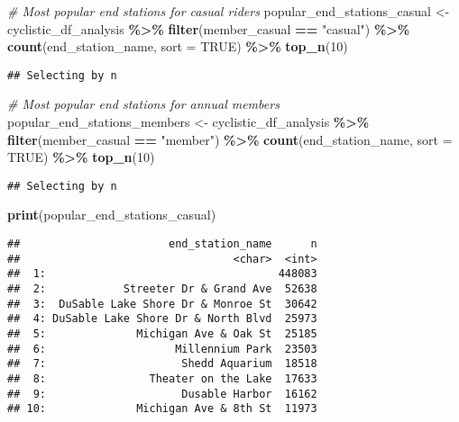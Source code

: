 \documentclass[
]{article}
\newenvironment{Shaded}{\begin{snugshade}}{\end{snugshade}}
\newcommand{\AttributeTok}[1]{\textcolor[rgb]{0.13,0.29,0.53}{#1}}
\newcommand{\CommentTok}[1]{\textcolor[rgb]{0.56,0.35,0.01}{\textit{#1}}}
\newcommand{\ConstantTok}[1]{\textcolor[rgb]{0.56,0.35,0.01}{#1}}
\newcommand{\DecValTok}[1]{\textcolor[rgb]{0.00,0.00,0.81}{#1}}
\newcommand{\FunctionTok}[1]{\textcolor[rgb]{0.13,0.29,0.53}{\textbf{#1}}}
\newcommand{\NormalTok}[1]{#1}
\newcommand{\OtherTok}[1]{\textcolor[rgb]{0.56,0.35,0.01}{#1}}
\newcommand{\SpecialCharTok}[1]{\textcolor[rgb]{0.81,0.36,0.00}{\textbf{#1}}}
\newcommand{\StringTok}[1]{\textcolor[rgb]{0.31,0.60,0.02}{#1}}
\begin{document}
\begin{Shaded}
\begin{Highlighting}[]
\CommentTok{\# Most popular end stations for casual riders}
\NormalTok{popular\_end\_stations\_casual }\OtherTok{\textless{}{-}}\NormalTok{ cyclistic\_df\_analysis }\SpecialCharTok{\%\textgreater{}\%}
  \FunctionTok{filter}\NormalTok{(member\_casual }\SpecialCharTok{==} \StringTok{"casual"}\NormalTok{) }\SpecialCharTok{\%\textgreater{}\%}
  \FunctionTok{count}\NormalTok{(end\_station\_name, }\AttributeTok{sort =} \ConstantTok{TRUE}\NormalTok{) }\SpecialCharTok{\%\textgreater{}\%}
  \FunctionTok{top\_n}\NormalTok{(}\DecValTok{10}\NormalTok{)}
\end{Highlighting}
\end{Shaded}

\begin{verbatim}
## Selecting by n
\end{verbatim}

\begin{Shaded}
\begin{Highlighting}[]
\CommentTok{\# Most popular end stations for annual members}
\NormalTok{popular\_end\_stations\_members }\OtherTok{\textless{}{-}}\NormalTok{ cyclistic\_df\_analysis }\SpecialCharTok{\%\textgreater{}\%}
  \FunctionTok{filter}\NormalTok{(member\_casual }\SpecialCharTok{==} \StringTok{"member"}\NormalTok{) }\SpecialCharTok{\%\textgreater{}\%}
  \FunctionTok{count}\NormalTok{(end\_station\_name, }\AttributeTok{sort =} \ConstantTok{TRUE}\NormalTok{) }\SpecialCharTok{\%\textgreater{}\%}
  \FunctionTok{top\_n}\NormalTok{(}\DecValTok{10}\NormalTok{)}
\end{Highlighting}
\end{Shaded}

\begin{verbatim}
## Selecting by n
\end{verbatim}

\begin{Shaded}
\begin{Highlighting}[]
\FunctionTok{print}\NormalTok{(popular\_end\_stations\_casual)}
\end{Highlighting}
\end{Shaded}

\begin{verbatim}
##                       end_station_name      n
##                                 <char>  <int>
##  1:                                    448083
##  2:            Streeter Dr & Grand Ave  52638
##  3:  DuSable Lake Shore Dr & Monroe St  30642
##  4: DuSable Lake Shore Dr & North Blvd  25973
##  5:              Michigan Ave & Oak St  25185
##  6:                    Millennium Park  23503
##  7:                     Shedd Aquarium  18518
##  8:                Theater on the Lake  17633
##  9:                     Dusable Harbor  16162
## 10:              Michigan Ave & 8th St  11973
\end{verbatim}
\end{document}
